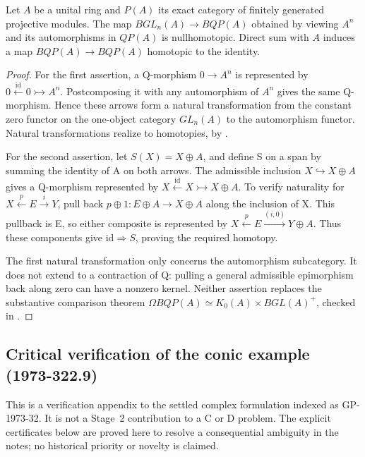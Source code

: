 \begin{proposition}\ours\quad
Let \(A\) be a unital ring and \(P(A)\) its exact category of finitely generated
projective modules. The map \(BGL_n(A)\to BQP(A)\) obtained by viewing
\(A^n\) and its automorphisms in \(QP(A)\) is nullhomotopic. Direct sum with
\(A\) induces a map \(BQP(A)\to BQP(A)\) homotopic to the identity.
\end{proposition}
\begin{proof}
For the first assertion, a Q-morphism \(0\to A^n\) is represented by
\(0\xleftarrow{\mathrm{id}}0\rightarrowtail A^n\). Postcomposing it with any
automorphism of \(A^n\) gives the same Q-morphism. Hence these arrows form a
natural transformation from the constant zero functor on the one-object
category \(GL_n(A)\) to the automorphism functor. Natural transformations realize
to homotopies, by \citet[\S1, Proposition~2]{quillen1973higher}.

For the second assertion, let \(S(X)=X\oplus A\), and define S on a span by
summing the identity of A on both arrows. The admissible inclusion
\(X\hookrightarrow X\oplus A\) gives a Q-morphism represented by
\(X\xleftarrow{\mathrm{id}}X\rightarrowtail X\oplus A\). To verify naturality
for \(X\xleftarrow{p}E\xrightarrow{i}Y\), pull back
\(p\oplus1:E\oplus A\to X\oplus A\) along the inclusion of X. This pullback
is E, so either composite is represented by
\(X\xleftarrow{p}E\xrightarrow{(i,0)}Y\oplus A\). Thus these components give
\(\mathrm{id}\Rightarrow S\), proving the required homotopy.

The first natural transformation only concerns the automorphism subcategory.
It does not extend to a contraction of Q: pulling a general admissible
epimorphism back along zero can have a nonzero kernel. Neither assertion replaces
the substantive comparison theorem
\(\Omega BQP(A)\simeq K_0(A)\times BGL(A)^+\), checked in
\citet[Corollary~IV.7.2]{weibel2013kbook}.
\end{proof}

\subsection{Critical verification of the conic example (1973-322.9)}
\label{sec:conic-verification-1973}

This is a verification appendix to the settled complex formulation indexed as
GP-1973-32. It is not a Stage~2 contribution to a C or D problem. The explicit
certificates below are proved here to resolve a consequential ambiguity in the
notes; no historical priority or novelty is claimed.


